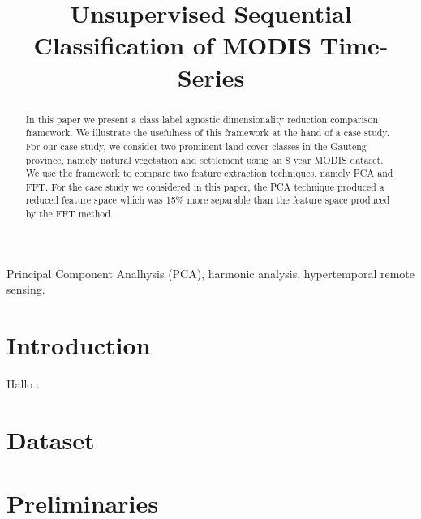 \documentclass{article}
\title{Unsupervised Sequential Classification of MODIS Time-Series}
\begin{document}
%
\maketitle
%
\begin{abstract}
In this paper we present a class label agnostic dimensionality reduction comparison framework. 
We illustrate the usefulness of this framework at the hand of a case study. For our case study, we consider two prominent land cover classes in the Gauteng province, namely natural vegetation and settlement using an 8 year MODIS dataset. We use the framework to compare two 
feature extraction techniques, namely PCA and FFT. For the case study we considered in this paper, the PCA technique produced a reduced feature space which was 15\% more 
separable than the feature space produced by the FFT method.
\end{abstract}
%
\begin{keywords}
Principal Component Analhysis (PCA), harmonic analysis, hypertemporal remote sensing.
\end{keywords}
%

\section{Introduction}
\label{sec:intro}
Hallo \cite{almeida2015}.

\section{Dataset}

\section{Preliminaries}
\end{document}
